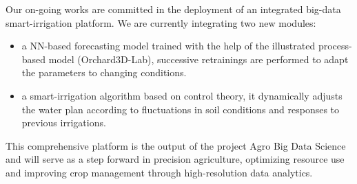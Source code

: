 Our on-going works are committed in the deployment of an integrated big-data smart-irrigation platform.
We are currently integrating two new modules:
\begin{itemize}
    \item a NN-based forecasting model trained with the help of the illustrated process-based model (Orchard3D-Lab), successive retrainings are performed to adapt the parameters to changing conditions.
    \item a smart-irrigation algorithm based on control theory, it dynamically adjusts the water plan according to fluctuations in soil conditions and responses to previous irrigations.
\end{itemize}

This comprehensive platform is the output of the project Agro Big Data Science \cite{ABDS} and will serve as a step forward in precision agriculture, optimizing resource use and improving crop management through high-resolution data analytics.

